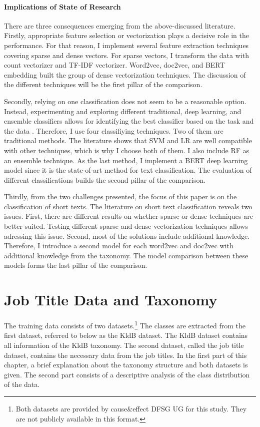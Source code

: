 \documentclass[12pt, a4paper, titlepage]{article}
\begin{document}
\paragraph{Implications of State of Research}
There are three consequences emerging from the above-discussed literature. Firstly, appropriate feature selection or vectorization plays a decisive role in the performance. For that reason, I implement several feature extraction techniques covering sparse and dense vectors. For sparse vectors, I transform the data with count vectorizer and \ac{TF-IDF} vectorizer. Word2vec, doc2vec, and \ac{BERT} embedding built the group of dense vectorization techniques. The discussion of the different techniques will be the first pillar of the comparison. 

Secondly, relying on one classification does not seem to be a reasonable option. Instead, experimenting and exploring different traditional, deep learning, and ensemble classifiers allows for identifying the best classifier based on the task and the data \citep{maglogiannis2007}. Therefore, I use four classifiying techniques. Two of them are traditional methods. The literature shows that \ac{SVM} and \ac{LR} are well compatible with other techniques, which is why I choose both of them. I also include \ac{RF} as an ensemble technique. As the last method, I implement a \ac{BERT} deep learning model since it is the state-of-art method for text classification. The evaluation of different classifications builds the second pillar of the comparison. 

Thirdly, from the two challenges presented, the focus of this paper is on the classification of short texts. The literature on short text classification reveals two issues. First, there are different results on whether sparse or dense techniques are better suited. Testing different sparse and dense vectorization techniques allows adressing this issue. Second, most of the solutions include additional knowledge. Therefore, I introduce a second model for each word2vec and doc2vec with additional knowledge from the taxonomy. The model comparison between these models forms the last pillar of the comparison. 

\section{Job Title Data and Taxonomy}
The training data consists of two datasets.\footnote{Both datasets are provided by cause\&effect DFSG UG for this study. They are not publicly available in this format.} The classes are extracted from the first dataset, referred to below as the \ac{KldB} dataset. The \ac{KldB} dataset contains all information of the \ac{KldB} taxonomy. The second dataset, called the job title dataset, contains the necessary data from the job titles. In the first part of this chapter, a brief explanation about the taxonomy structure and both datasets is given. The second part consists of a descriptive analysis of the class distribution of the data. 
\end{document}
